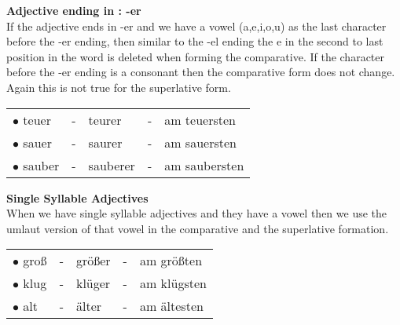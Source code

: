 \documentclass[a4paper,12pt]{article}
\begin{document}
\begin{adjustwidth}{2em}{0pt}
\begin{adjustwidth}{3em}{0pt}
\begin{tabular}{l l l l l}
\end{tabular}
\vspace{0.3cm}
\newline


\textbf{Adjective ending in : -er}\\
If the adjective ends in -er and we have
a vowel (a,e,i,o,u) as the last character before the -er ending, then similar to
the -el ending the e in the second to last position in the word is deleted when
forming the comparative. If the character before the -er ending is a consonant
then the comparative form does not change.  Again this is not true for the
superlative form.


\vspace{0.3cm}
\begin{tabular}{l l l l l}

\rowcolor{white} $\bullet$ teuer  & - & teurer   & - & am teuersten \\
\rowcolor{white} $\bullet$ sauer  & - & saurer   & - & am sauersten \\
\rowcolor{white} $\bullet$ sauber & - & sauberer & - & am saubersten \\



\end{tabular}
\vspace{0.3cm}
\newline


\textbf{Single Syllable Adjectives} \\
When we have single syllable adjectives and they have a vowel then we use the
umlaut version of that vowel in the comparative and the superlative formation.


\vspace{0.3cm}
\begin{tabular}{l l l l l}

\rowcolor{white} $\bullet$ groß & - & größer & - & am größten \\
\rowcolor{white} $\bullet$ klug & - & klüger & - & am klügsten \\
\rowcolor{white} $\bullet$ alt  & - & älter  & - & am ältesten \\




\end{tabular}
\end{adjustwidth}
\end{adjustwidth}
\end{document}
